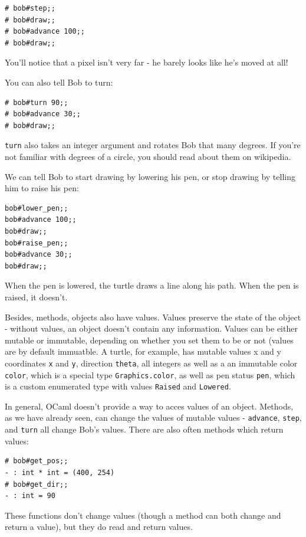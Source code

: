 \documentclass[10pt]{book}
\begin{document}
{\beforeverb
\begin{verbatim}
# bob#step;;
# bob#draw;;
# bob#advance 100;;
# bob#draw;;
\end{verbatim}
\afterverb

You'll notice that a pixel isn't very far - he barely looks like he's moved at all!

You can also tell Bob to turn:

\beforeverb
\begin{verbatim}
# bob#turn 90;;
# bob#advance 30;;
# bob#draw;;
\end{verbatim}
\afterverb

{\tt turn} also takes an integer argument and rotates Bob that many degrees. If you're not familiar with degrees of a circle, you should read about them on wikipedia.

We can tell Bob to start drawing by lowering his pen, or stop drawing by telling him to raise his pen:

\beforeverb
\begin{verbatim}
bob#lower_pen;;
bob#advance 100;;
bob#draw;;
bob#raise_pen;;
bob#advance 30;;
bob#draw;;
\end{verbatim}
\afterverb

When the pen is lowered, the turtle draws a line along his path. When the pen is raised, it doesn't.

Besides, methods, objects also have values. Values preserve the state of the object - without values, an object doesn't contain any information. Values can be either mutable or immutable, depending on whether you set them to be or not (values are by default immuatble. A turtle, for example, has mutable values x and y coordinates {\tt x} and {\tt y}, direction {\tt theta}, all integers as well as a an immutable color {\tt color}, which is a special type {\tt Graphics.color}, as well as pen status {\tt pen}, which is a custom enumerated type with values {\tt Raised} and {\tt Lowered}.

In general, OCaml doesn't provide a way to acces values of an object. Methods, as we have already seen, can change the values of mutable values - {\tt advance}, {\tt step}, and {\tt turn} all change Bob's values. There are also often methods which return values:

\beforeverb
\begin{verbatim}
# bob#get_pos;;
- : int * int = (400, 254)
# bob#get_dir;;
- : int = 90
\end{verbatim}
\afterverb

These functions don't change values (though a method can both change and return a value), but they do read and return values.

}
\end{document}
